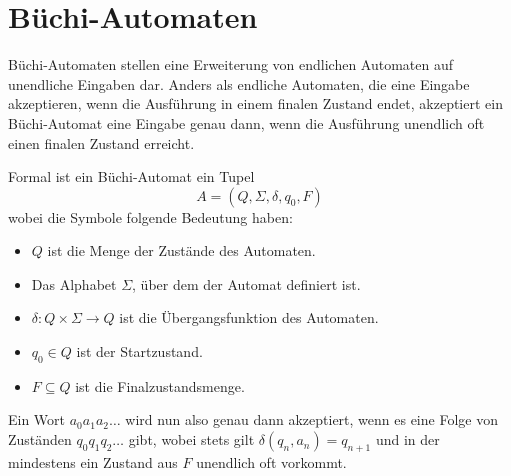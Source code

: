 \section{Büchi-Automaten}
Büchi-Automaten stellen eine Erweiterung von endlichen Automaten auf unendliche Eingaben dar\cite{buchibasics}.
Anders als endliche Automaten, die eine Eingabe akzeptieren, wenn die Ausführung in einem finalen Zustand endet, akzeptiert ein Büchi-Automat eine Eingabe genau dann, wenn die Ausführung unendlich oft einen finalen Zustand erreicht.

Formal ist ein Büchi-Automat ein Tupel
\[ A = (Q,\Sigma,\delta,q_0,F) \]
wobei die Symbole folgende Bedeutung haben:
\begin{itemize}
  \item $Q$ ist die Menge der Zustände des Automaten.
  \item Das Alphabet $\Sigma$, über dem der Automat definiert ist.
  \item $\delta : Q\times\Sigma\rightarrow Q$ ist die Übergangsfunktion des Automaten.
  \item $q_0\in Q$ ist der Startzustand.
  \item $F\subseteq Q$ ist die Finalzustandsmenge.
\end{itemize}
Ein Wort $a_0a_1a_2\dots$ wird nun also genau dann akzeptiert, wenn es eine Folge von Zuständen $q_0q_1q_2\dots$ gibt, wobei stets gilt $\delta(q_n,a_n)=q_{n+1}$ und in der mindestens ein Zustand aus $F$ unendlich oft vorkommt.